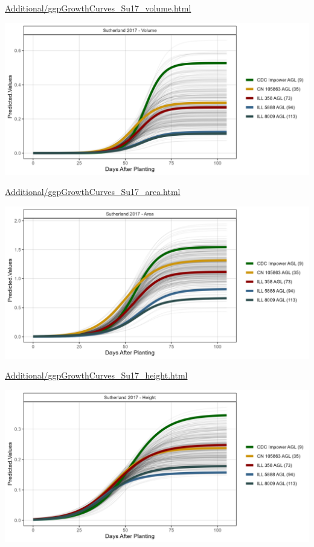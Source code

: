 \documentclass[
]{article}
\begin{document}
\href{https://derekmichaelwright.github.io/AGILE_LDP_UAV/Additional/ggpGrowthCurves_Su17_volume.html}{Additional/ggpGrowthCurves\_Su17\_volume.html}

\includegraphics{Additional/ggGrowthCurves_Su17_volume.png}

\href{https://derekmichaelwright.github.io/AGILE_LDP_UAV/Additional/ggpGrowthCurves_Su17_area.html}{Additional/ggpGrowthCurves\_Su17\_area.html}

\includegraphics{Additional/ggGrowthCurves_Su17_area.png}

\href{https://derekmichaelwright.github.io/AGILE_LDP_UAV/Additional/ggpGrowthCurves_Su17_height.html}{Additional/ggpGrowthCurves\_Su17\_height.html}

\includegraphics{Additional/ggGrowthCurves_Su17_height.png}
\end{document}
